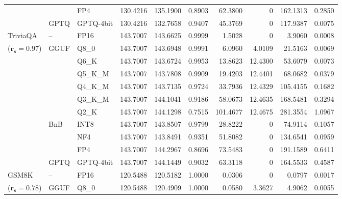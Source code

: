 \begin{longtable}{ll l rrrrrrr}
 &  & FP4 & 130.4216 & 135.1900 & \cellcolor{red!18} 0.8903 & \cellcolor{red!18} 62.3800 & \cellcolor{cyan!12} $0$ & \cellcolor{red!18} 162.1313 & \cellcolor{red!18} 0.2850 \\
 & GPTQ & GPTQ-4bit & 130.4216 & 132.7658 & \cellcolor{red!18} 0.9407 & \cellcolor{red!18} 45.3769 & \cellcolor{cyan!12} $0$ & \cellcolor{red!18} 117.9387 & \cellcolor{red!18} 0.0075 \\
\midrule
TriviaQA & -- & FP16 & 143.7007 & 143.6625 & 0.9999 & 1.5028 & \cellcolor{cyan!12} $0$ & 3.9060 & 0.0008 \\
{\small ($\mathbf{r_s{=}0.97}$)} & GGUF & Q8\_0 & 143.7007 & 143.6948 & 0.9991 & 6.0960 & 4.0109 & 21.5163 & 0.0069 \\
 &  & Q6\_K & 143.7007 & 143.6724 & 0.9953 & 13.8623 & 12.4300 & 53.6079 & 0.0073 \\
 &  & Q5\_K\_M & 143.7007 & 143.7808 & 0.9909 & 19.4203 & 12.4401 & 68.0682 & 0.0379 \\
 &  & Q4\_K\_M & 143.7007 & 143.7135 & 0.9724 & 33.7936 & 12.4329 & 105.4155 & 0.1682 \\
 &  & Q3\_K\_M & 143.7007 & 144.1041 & \cellcolor{red!18} 0.9186 & \cellcolor{red!18} 58.0673 & 12.4635 & \cellcolor{red!18} 168.5481 & \cellcolor{red!18} 0.3294 \\
 &  & Q2\_K & 143.7007 & 144.1298 & \cellcolor{red!35} 0.7515 & \cellcolor{red!35} 101.4677 & 12.4675 & \cellcolor{red!35} 281.3554 & \cellcolor{red!35} 1.0967 \\
 & BnB & INT8 & 143.7007 & 143.8507 & 0.9799 & 28.8222 & \cellcolor{cyan!12} $0$ & 74.9114 & 0.1057 \\
 &  & NF4 & 143.7007 & 143.8491 & \cellcolor{red!18} 0.9351 & \cellcolor{red!18} 51.8082 & \cellcolor{cyan!12} $0$ & \cellcolor{red!18} 134.6541 & \cellcolor{red!18} 0.0959 \\
 &  & FP4 & 143.7007 & 144.2967 & \cellcolor{red!18} 0.8696 & \cellcolor{red!18} 73.5483 & \cellcolor{cyan!12} $0$ & \cellcolor{red!18} 191.1589 & \cellcolor{red!18} 0.6411 \\
 & GPTQ & GPTQ-4bit & 143.7007 & 144.1449 & \cellcolor{red!18} 0.9032 & \cellcolor{red!18} 63.3118 & \cellcolor{cyan!12} $0$ & \cellcolor{red!18} 164.5533 & \cellcolor{red!18} 0.4587 \\
\midrule
GSM8K & -- & FP16 & 120.5488 & 120.5182 & 1.0000 & 0.0306 & \cellcolor{cyan!12} $0$ & 0.0797 & 0.0017 \\
{\small ($\mathbf{r_s{=}0.78}$)} & GGUF & Q8\_0 & 120.5488 & 120.4909 & 1.0000 & 0.0580 & 3.3627 & 4.9062 & 0.0055 \\

\end{longtable}
